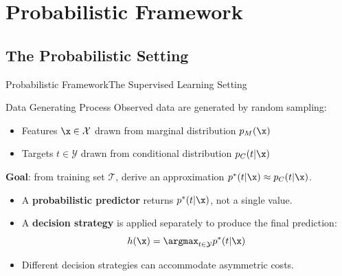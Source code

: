 \section{Probabilistic Framework}

\subsection{The Probabilistic Setting}

\begin{frame}{Probabilistic Framework}{The Supervised Learning Setting}
  \begin{block}{Data Generating Process}
    Observed data are generated by random sampling:
    \begin{itemize}
      \item Features $\x \in \mathcal{X}$ drawn from marginal distribution $p_M(\x)$
      \item Targets $t \in \mathcal{Y}$ drawn from conditional distribution $p_C(t|\x)$
    \end{itemize}
  \end{block}

  \bigskip
  \textbf{Goal}: from training set $\mathcal{T}$, derive an approximation $p^*(t|\x) \approx p_C(t|\x)$.

  \begin{itemize}
    \item A \textbf{probabilistic predictor} returns $p^*(t|\x)$, not a single value.
    \item A \textbf{decision strategy} is applied separately to produce the final prediction:
    \[
      h(\x) = \argmax_{t \in \mathcal{Y}} p^*(t|\x)
    \]
    \item Different decision strategies can accommodate asymmetric costs.
  \end{itemize}
\end{frame}

